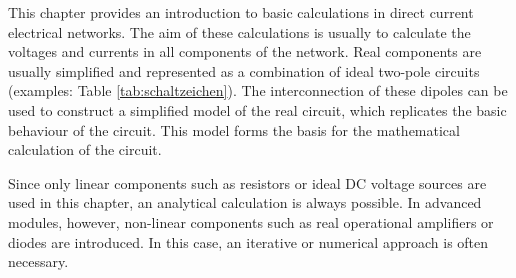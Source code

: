 {	This chapter provides an introduction to basic calculations in direct current electrical networks.
	The aim of these calculations is usually to calculate the voltages and currents in all components of the network.
 	Real components are usually simplified and represented as a combination of ideal two-pole circuits
 	(examples: Table \ref{tab:schaltzeichen}). The interconnection of these 
    dipoles can be used to construct a simplified model of the real circuit, which replicates the basic behaviour of the 
    circuit. This model forms the basis for the mathematical calculation of the circuit.
            
	Since only linear components such as resistors or ideal DC voltage sources are used in this chapter, an analytical 
    calculation is always possible. In advanced modules, however, non-linear components
    such as real operational amplifiers or diodes are introduced. In this case, an iterative or numerical approach is often
    necessary.
	
	
	
}





